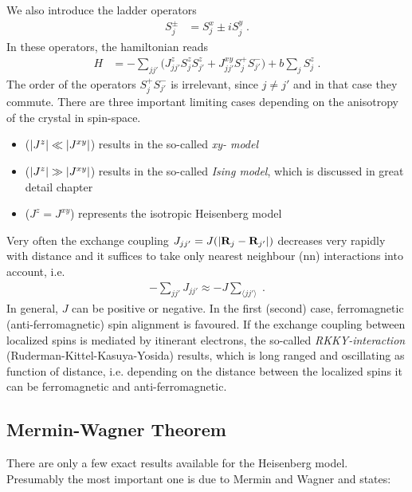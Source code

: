 %
We also introduce the ladder operators
%
\begin{align}\label{eq:}
S_{j}^{\pm} &= S_{j}^{x}\pm i S_{j}^{y}\;.
\end{align}
%
In these operators, the hamiltonian reads
\begin{align*}
H &= - \sum_{jj'} \bigg( J^{z}_{jj'} S_{j}^{z}  S_{j'}^{z}
+J_{jj'}^{xy}S_{j}^{+} S_{j'}^{-}
\bigg) + b \sum_{j} S^{z}_{j}\;.
\end{align*}
%
The order of the operators $S_{j}^{+}S_{j'}^{-}$ is irrelevant, since $j\ne j'$ and in that case they commute.
There are three important limiting cases depending on the anisotropy of the crystal in spin-space.
\begin{itemize}
	\item ($\abs{J^{z}}\ll\abs{J^{xy}}$) results in the so-called {\em xy- model}

\item ($\abs{J^{z}}\gg\abs{J^{xy}}$) results in the so-called {\em Ising model}, which is discussed in great detail chapter 
\item ($J^{z} = J^{xy}$)  represents the isotropic Heisenberg model

%
\end{itemize}
%
Very often the exchange coupling $J_{jj'} = J(\abs{\mathbf R_{j}-\mathbf R_{j'}})$ decreases
very rapidly with distance and it suffices to take only nearest neighbour (nn) interactions into account, i.e.
%
\begin{align}\label{eq:}
-\sum_{jj'} J_{jj'} \approx -J \sum_{\langle jj' \rangle}\;.
\end{align}
%
In general, $J$ can be positive or negative. In the first (second) case,  ferromagnetic (anti-ferromagnetic) spin alignment is favoured. If the exchange coupling between localized spins
is mediated by itinerant electrons, the so-called {\em RKKY-interaction} (Ruderman-Kittel-Kasuya-Yosida) results, which is long ranged and oscillating as function of distance, i.e.
depending on the distance between the localized spins it can be ferromagnetic and anti-ferromagnetic.
\subsection{Mermin-Wagner Theorem}
%
There are only a few exact results available for the Heisenberg model. Presumably the most important one is due to Mermin and Wagner and states:

